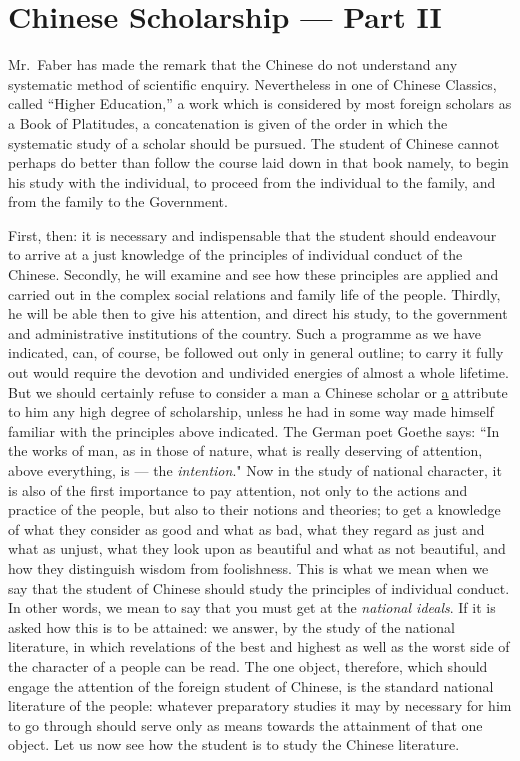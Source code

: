 \chapter{Chinese Scholarship --- Part II}
Mr.~Faber has made the remark that the Chinese do not understand any systematic method of scientific enquiry.
Nevertheless in one of Chinese Classics, called ``Higher Education,''\cite{num26}  a work which is considered by most foreign scholars as a Book of Platitudes, a concatenation is given of the order in which the systematic study of a scholar should be pursued.
The student of Chinese cannot perhaps do better than follow the course laid down in that book namely, to begin his study  with the individual, to proceed from the individual to the family, and from the family to the Government. 

First, then: it is necessary and indispensable that the student should endeavour to arrive at a just knowledge of the principles of individual conduct of the Chinese.
Secondly, he will examine and see how these principles are applied and carried out in the complex social relations and family life of the people.
Thirdly, he will be able then to give his attention, and direct his study, to the government and administrative institutions of the country.
Such a programme as we have indicated, can, of course, be followed out only in general outline; to carry it fully out would require the devotion and undivided energies of almost a whole lifetime.
But we should certainly refuse to consider a man a Chinese scholar or \underline{a} attribute to him any high degree of scholarship, unless he had in some way made himself familiar with the principles above indicated.
The German poet Goethe says: ``In the works of man, as in those of nature, what is really deserving of attention, above everything, is --- the \emph{intention}."
Now in the study of national character, it is also of the first importance to pay attention, not only to the actions and practice of the people, but also to their notions and theories; to get a knowledge of what they consider as good and what as bad, what they regard as just and what as unjust, what they look upon as beautiful and what as not beautiful, and how they distinguish wisdom from foolishness.
This is what we mean when we say that the student of Chinese should study the principles of individual conduct.
In other words, we mean to say that you must get at the \emph{national ideals}.
If it is asked how this is to be attained: we answer, by the study of the national literature, in which revelations of the best and highest as well as the worst side of the character of a people can be read.
The one object, therefore, which should engage the attention of the foreign student of Chinese, is the standard national literature of the people: whatever preparatory studies it may by necessary for him to go through should serve only as means towards the attainment of that one object.
Let us now see how the student is to study the Chinese literature.

